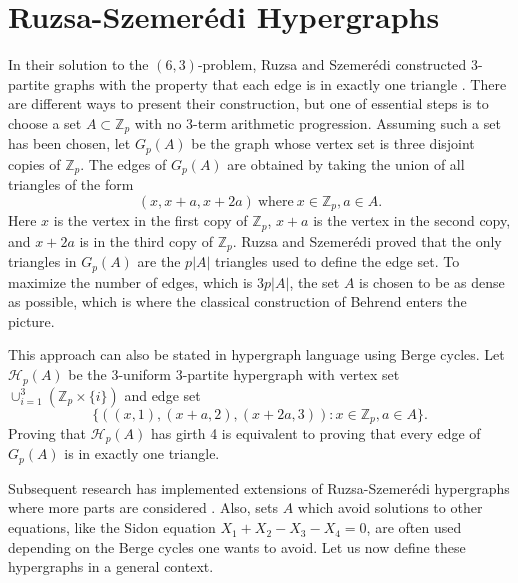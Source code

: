 \documentclass[12pt]{article}%
\begin{document}


\section{Ruzsa-Szemer\'{e}di Hypergraphs}\label{sec: setup}

In their solution to the $(6,3)$-problem, Ruzsa and Szemer\'{e}di 
constructed 3-partite graphs with the property that each  
edge is in exactly one triangle \cite{RS}.  
There are different ways to present their construction, but one of essential steps is to choose a set $A \subset \mathbb{Z}_p$ with no 3-term arithmetic progression.  Assuming such a set has been chosen, let $G_p(A)$ be the graph whose vertex set is three disjoint copies of $\mathbb{Z}_p$.  
The edges of $G_p(A)$ are obtained by taking 
the union of all triangles of the form 
\[
(x,x+a,x+2a) ~\mbox{where}~ x \in \mathbb{Z}_p, a \in A.
\]
Here $x$ is the vertex in the first copy of $\mathbb{Z}_p$, $x + a$ is the vertex in the second copy, and $x + 2a$ is in the third copy of $\mathbb{Z}_p$.  
Ruzsa and Szemer\'{e}di proved that the only triangles in 
$G_p(A)$ are the $p |A|$ triangles used to define
the edge set.  To maximize the number of edges, which is $3p|A|$, the set $A$ is chosen to be as dense as possible, which is where the classical construction of Behrend enters the picture.  

This approach can also be stated in hypergraph language using Berge cycles.  Let 
$\mathcal{H}_p( A)$ be the 3-uniform 3-partite hypergraph with vertex set $\cup_{i=1}^{3} ( \mathbb{Z}_p \times \{ i \} )$ and edge set  
\[
\{  \left(   (x,1) , (x + a , 2) , (x + 2a , 3) \right)  : x \in \mathbb{Z}_p , a \in A \}.
\]
Proving that $\mathcal{H}_p( A )$ has girth 4
is equivalent to proving that every edge of $G_p(A)$ is in exactly one triangle.    

Subsequent research has implemented extensions of Ruzsa-Szemer\'{e}di hypergraphs where more parts are considered \cite{alon, alonFischerSzegedy, Ge, LV}.  Also, sets $A$ which avoid solutions to other equations, like the Sidon equation $X_1 + X_2 - X_3 - X_4 = 0$, are often used depending on the Berge cycles one wants to avoid.      
Let us now define these hypergraphs in a general context.  
\end{document}
